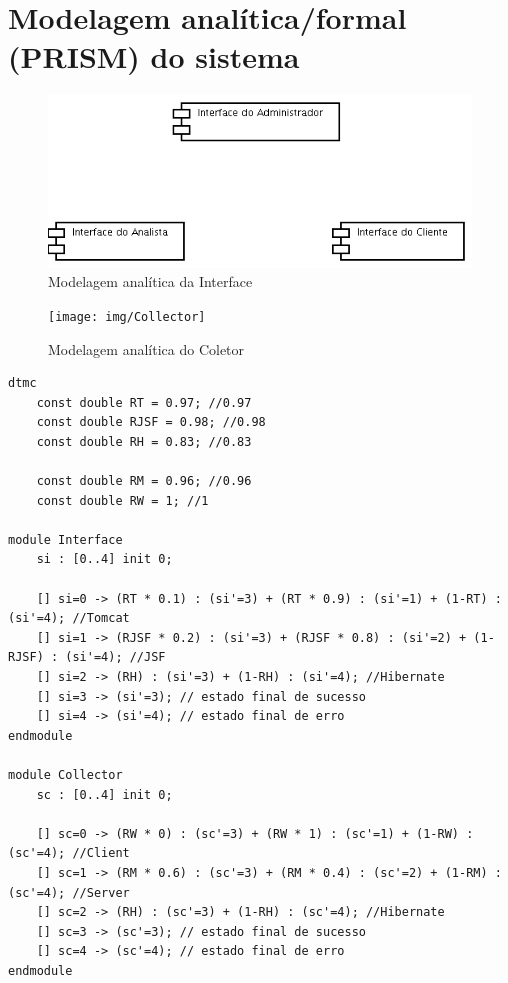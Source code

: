 \section{Modelagem analítica/formal (PRISM) do sistema}

\begin{figure}[htbp]
\centering
\includegraphics[width=1.0\textwidth]{img/Interface}
\caption{Modelagem analítica da Interface}
\label{fig:anali-inter}
\end{figure}

\begin{figure}[htbp]
\centering
\texttt{[image: img/Collector]}
\caption{Modelagem analítica do Coletor}
\label{fig:anali-coletor}
\end{figure}

\begin{verbatim}
dtmc
	const double RT = 0.97; //0.97
	const double RJSF = 0.98; //0.98
	const double RH = 0.83; //0.83

	const double RM = 0.96; //0.96
	const double RW = 1; //1

module Interface
	si : [0..4] init 0;
	
	[] si=0 -> (RT * 0.1) : (si'=3) + (RT * 0.9) : (si'=1) + (1-RT) : (si'=4); //Tomcat
	[] si=1 -> (RJSF * 0.2) : (si'=3) + (RJSF * 0.8) : (si'=2) + (1-RJSF) : (si'=4); //JSF
	[] si=2 -> (RH) : (si'=3) + (1-RH) : (si'=4); //Hibernate
	[] si=3 -> (si'=3); // estado final de sucesso
	[] si=4 -> (si'=4); // estado final de erro
endmodule

module Collector
	sc : [0..4] init 0;
	
	[] sc=0 -> (RW * 0) : (sc'=3) + (RW * 1) : (sc'=1) + (1-RW) : (sc'=4); //Client
	[] sc=1 -> (RM * 0.6) : (sc'=3) + (RM * 0.4) : (sc'=2) + (1-RM) : (sc'=4); //Server
	[] sc=2 -> (RH) : (sc'=3) + (1-RH) : (sc'=4); //Hibernate
	[] sc=3 -> (sc'=3); // estado final de sucesso
	[] sc=4 -> (sc'=4); // estado final de erro
endmodule
\end{verbatim}


